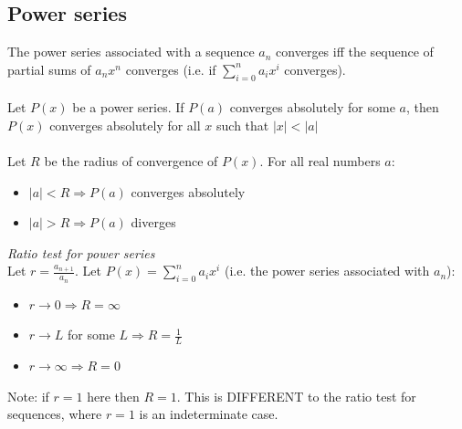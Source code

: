 \documentclass{article}
\begin{document}
\subsection{Power series}
The power series associated with a sequence $ a_{n} $ converges iff the sequence of partial sums  of $ a_{n}x^{n} $ converges (i.e. if $ \sum_{i = 0}^{n} a_{i}x^{i} $ converges).
\\\\
Let $ P(x) $ be a power series. If $ P(a) $ converges absolutely for some $ a $, then $ P(x) $ converges absolutely for all $ x $ such that $ |x| < |a| $
\\\\
Let $ R $ be the radius of convergence of $ P(x) $. For all real numbers $ a $:
\begin{itemize}
\item $ |a| < R \Rightarrow P(a) $ converges absolutely
\item $ |a| > R \Rightarrow P(a) $ diverges
\end{itemize}
\textit{Ratio test for power series}
\\
Let $ r = \frac{a_{n + 1}}{a_{n}} $. Let $ P(x) = \sum_{i = 0}^{n} a_{i}x^{i} $ (i.e. the power series associated with $ a_{n} $):
\begin{itemize}
\item $ r \to 0 \Rightarrow R = \infty $
\item $ r \to L $ for some $ L \Rightarrow R = \frac{1}{L} $
\item $ r \to \infty \Rightarrow R = 0 $
\end{itemize}
Note: if $ r = 1 $ here then $ R = 1 $. This is DIFFERENT to the ratio test for sequences, where $ r = 1 $ is an indeterminate case.
\end{document}
